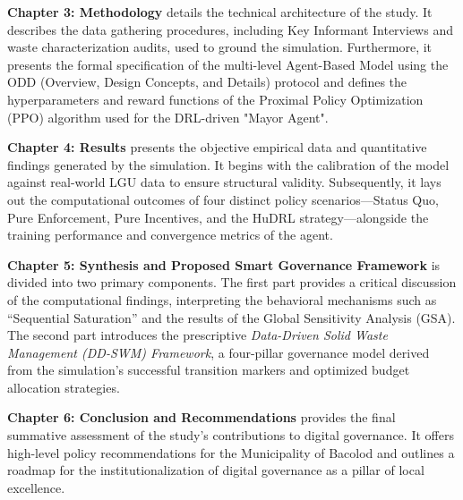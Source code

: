 \textbf{Chapter 3: Methodology} details the technical architecture of the study. It describes the data gathering procedures, including Key Informant Interviews and waste characterization audits, used to ground the simulation. Furthermore, it presents the formal specification of the multi-level Agent-Based Model using the ODD (Overview, Design Concepts, and Details) protocol and defines the hyperparameters and reward functions of the Proximal Policy Optimization (PPO) algorithm used for the DRL-driven "Mayor Agent".

\textbf{Chapter 4: Results} presents the objective empirical data and quantitative findings generated by the simulation. It begins with the calibration of the model against real-world LGU data to ensure structural validity. Subsequently, it lays out the computational outcomes of four distinct policy scenarios---Status Quo, Pure Enforcement, Pure Incentives, and the HuDRL strategy---alongside the training performance and convergence metrics of the agent.

\textbf{Chapter 5: Synthesis and Proposed Smart Governance Framework} is divided into two primary components. The first part provides a critical discussion of the computational findings, interpreting the behavioral mechanisms such as ``Sequential Saturation'' and the results of the Global Sensitivity Analysis (GSA). The second part introduces the prescriptive \textit{Data-Driven Solid Waste Management (DD-SWM) Framework}, a four-pillar governance model derived from the simulation's successful transition markers and optimized budget allocation strategies.

\textbf{Chapter 6: Conclusion and Recommendations} provides the final summative assessment of the study’s contributions to digital governance. It offers high-level policy recommendations for the Municipality of Bacolod and outlines a roadmap for the institutionalization of digital governance as a pillar of local excellence.